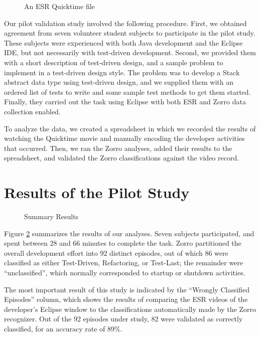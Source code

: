 \documentclass[runningheads]{llncs}
\begin{document}
\begin{figure}[t] 
  \centering
  \caption{An ESR Quicktime file}
  \label{fig:esr}
\end{figure} 

Our pilot validation study involved the following procedure. First, we
obtained agreement from seven volunteer student subjects to participate in the
pilot study. These subjects were experienced with both Java development and
the Eclipse IDE, but not necessarily with test-driven development.  Second,
we provided them with a short description of test-driven design, and a
sample problem to implement in a test-driven design style.  The problem
was to develop a Stack abstract data type using test-driven design, and we
supplied them with an ordered list of tests to write and some sample test
methods to get them started.  Finally, they carried out the task using
Eclipse with both ESR and Zorro data collection enabled. 

To analyze the data, we created a spreadsheet in which we recorded the
results of watching the Quicktime movie and manually encoding the developer
activities that occurred.  Then, we ran the Zorro analyses, added their
results to the spreadsheet, and validated the Zorro classifications against
the video record.

\section{Results of the Pilot Study}
\label{sec:results}

\begin{figure}[t] 
  \centering
  \caption{Summary Results}
  \label{fig:data-summary}
\end{figure} 


Figure \ref{fig:data-summary} summarizes the results of our analyses.
Seven subjects participated, and spent between 28 and 66 minutes to
complete the task.  Zorro partitioned the overall development effort into
92 distinct episodes, out of which 86 were classified as either
Test-Driven, Refactoring, or Test-Last; the remainder were
``unclassified'', which normally corresponded to startup or shutdown
activities.

The most important result of this study is indicated by the ``Wrongly
Classified Episodes'' column, which shows the results of comparing the ESR
videos of the developer's Eclipse window to the classifications
automatically made by the Zorro recognizer.  Out of the 92 episodes under
study, 82 were validated as correctly classified, for an accuracy rate of
89\%.
\end{document}
